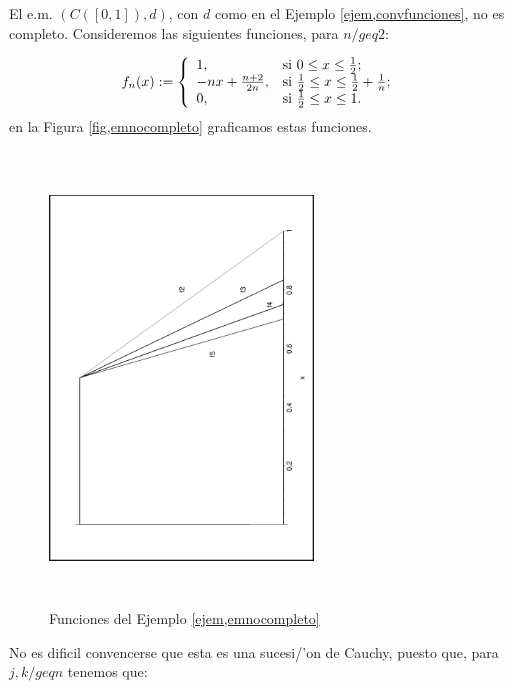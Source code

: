 \begin{ejemplo}\label{ejem,emnocompleto} El e.m. $(C([0,1]),d)$, con $d$ como en el Ejemplo
\vref{ejem,convfunciones}, no es completo. Consideremos las
siguientes funciones, para $n/geq 2$:

\[
    f_n(x):=\left\{
                \begin{array}{ll}
                        1, & \hbox{si $0\leq x\leq \frac12$;} \\
                        -nx+\frac{n+2}{2n}, & \hbox{si $\frac12\leq x\leq \frac12+\frac1{n}$;} \\
                        0, & \hbox{si $\frac12\leq x\leq 1$.} \\
\end{array}
\right.
\]
 en la Figura \vref{fig,emnocompleto} graficamos estas
funciones.
\begin{figure}[h]
\begin{center}
    \includegraphics[height=12cm,width=7cm,angle=-90]{funciones1.eps}
    \caption{Funciones del Ejemplo
    \ref{ejem,emnocompleto}}\label{fig,emnocompleto}
\end{center}
\end{figure}

No es dificil convencerse que esta es una sucesi/'on de Cauchy,
puesto que, para $j,k/geq n$ tenemos que:


\end{ejemplo}
